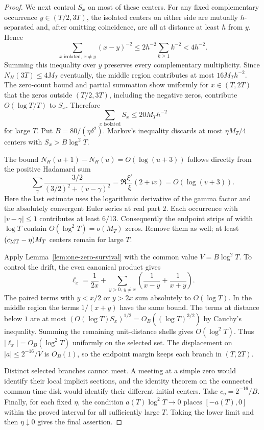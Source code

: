 \begin{proof}
We next control $S_x$ on most of these centers. For any fixed complementary occurrence $y\in(T/2,3T)$, the isolated centers on either side are mutually $h$-separated and, after omitting coincidence, are all at distance at least $h$ from $y$. Hence
\[
 \sum_{x\text{ isolated},\,x\ne y}(x-y)^{-2}
 \le2h^{-2}\sum_{k\ge1}k^{-2}<4h^{-2}.
\]
Summing this inequality over $y$ preserves every complementary multiplicity. Since $N_H(3T)\le4M_T$ eventually, the middle region contributes at most $16M_Th^{-2}$. The zero-count bound and partial summation show uniformly for $x\in(T,2T)$ that the zeros outside $(T/2,3T)$, including the negative zeros, contribute $O(\log T/T)$ to $S_x$. Therefore
\[
                 \sum_{x\text{ isolated}}S_x\le20M_Th^{-2}
\]
for large $T$. Put $B=80/(\eta\delta^2)$. Markov's inequality discards at most $\eta M_T/4$ centers with $S_x>B\log^2T$.

The bound $N_H(u+1)-N_H(u)=O(\log(u+3))$ follows directly from the positive Hadamard sum
\[
 \sum_\gamma\frac{3/2}{(3/2)^2+(v-\gamma)^2}
 =\Re\frac{\xi'}\xi(2+iv)=O(\log(v+3)).
\]
Here the last estimate uses the logarithmic derivative of the gamma factor and the absolutely convergent Euler series at real part $2$. Each occurrence with $|v-\gamma|\le1$ contributes at least $6/13$. Consequently the endpoint strips of width $\log T$ contain $O(\log^2T)=o(M_T)$ zeros. Remove them as well; at least $(c_{\rm MT}-\eta)M_T$ centers remain for large $T$.

Apply Lemma~\ref{lem:one-zero-survival} with the common value $V=B\log^2T$. To control the drift, the even canonical product gives
\[
 \ell_x=\frac1{2x}+
 \sum_{y>0,\,y\ne x}
       \left(\frac1{x-y}+\frac1{x+y}\right).
\]
The paired terms with $y<x/2$ or $y>2x$ sum absolutely to $O(\log T)$. In the middle region the terms $1/(x+y)$ have the same bound. The terms at distance below $1$ are at most
$(O(\log T)S_x)^{1/2}=O_B((\log T)^{3/2})$ by Cauchy's inequality. Summing the remaining unit-distance shells gives $O(\log^2T)$. Thus $|\ell_x|=O_B(\log^2T)$ uniformly on the selected set. The displacement on $|a|\le2^{-16}/V$ is $O_B(1)$, so the endpoint margin keeps each branch in $(T,2T)$.

Distinct selected branches cannot meet. A meeting at a simple zero would identify their local implicit sections, and the identity theorem on the connected common time disk would identify their different initial centers. Take $c_\eta=2^{-16}/B$.
Finally, for each fixed $\eta$, the condition $a(T)\log^2T\to0$ places $[-a(T),0]$ within the proved interval for all sufficiently large $T$. Taking the lower limit and then $\eta\downarrow0$ gives the final assertion.
\end{proof}
